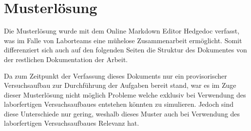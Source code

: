 \chapter{Musterlösung}

\label{muster}
Die Musterlösung wurde mit dem Online Markdown Editor Hedgedoc verfasst, was im Falle von Laborteams eine mühelose Zusammenarbeit ermöglicht.
Somit differenziert sich auch auf den folgenden Seiten die Struktur des Dokumentes von der restlichen Dokumentation der Arbeit.

Da zum Zeitpunkt der Verfassung dieses Dokuments nur ein provisorischer Versuchsaufbau zur Durchführung der Aufgaben bereit stand, war es im Zuge dieser Musterlösung nicht möglich Probleme welche exklusiv bei Verwendung des laborfertigen Versuchsaufbaues entstehen könnten zu simulieren.
Jedoch sind diese Unterschiede nur gering, weshalb dieses Muster auch bei Verwendung des laborfertigen Versuchsaufbaues Relevanz hat.

